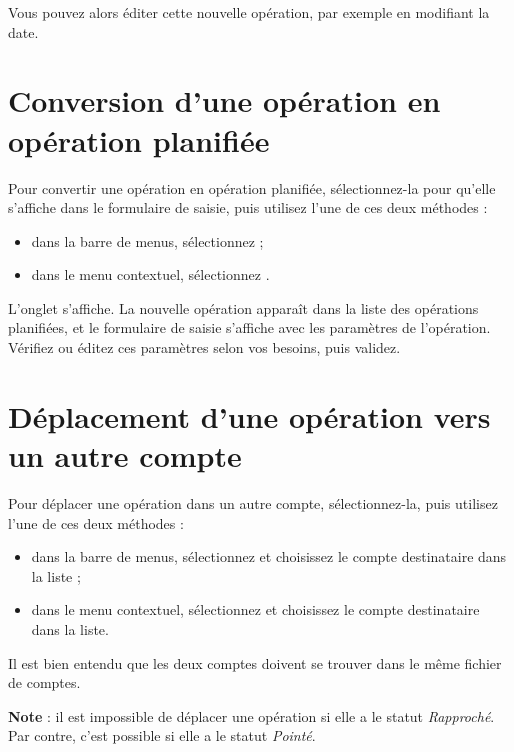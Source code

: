 Vous pouvez alors éditer cette nouvelle opération, par exemple en modifiant la date.


\section{Conversion d'une opération en opération planifiée\label{transactions-schedule}}


Pour convertir une opération en opération planifiée, sélectionnez-la pour qu'elle s'affiche dans le formulaire de saisie, puis utilisez l'une de ces deux méthodes :
\begin{itemize}
	 \item dans la barre de menus, sélectionnez  ;
	 \item dans le menu contextuel, sélectionnez .
\end{itemize}

L'onglet  s'affiche. La nouvelle opération apparaît dans la liste des opérations planifiées, et le formulaire de saisie s'affiche avec les paramètres de l'opération. Vérifiez ou éditez ces paramètres selon vos besoins, puis validez.


\section{Déplacement d'une opération vers un autre compte\label{transactions-move}}


Pour déplacer une opération dans un autre compte, sélectionnez-la, puis utilisez l'une de ces deux méthodes :

\begin{itemize}
	 \item dans la barre de menus, sélectionnez  et choisissez le compte destinataire dans la liste ;
	 \item dans le menu contextuel, sélectionnez  et choisissez le compte destinataire dans la liste.
\end{itemize}

Il est bien entendu que les deux comptes doivent se trouver dans le même fichier de comptes.

\textbf{Note} : il est impossible de déplacer une opération si elle a le statut \emph{Rapproché}. Par contre, c'est possible si elle a le statut \emph{Pointé}.



